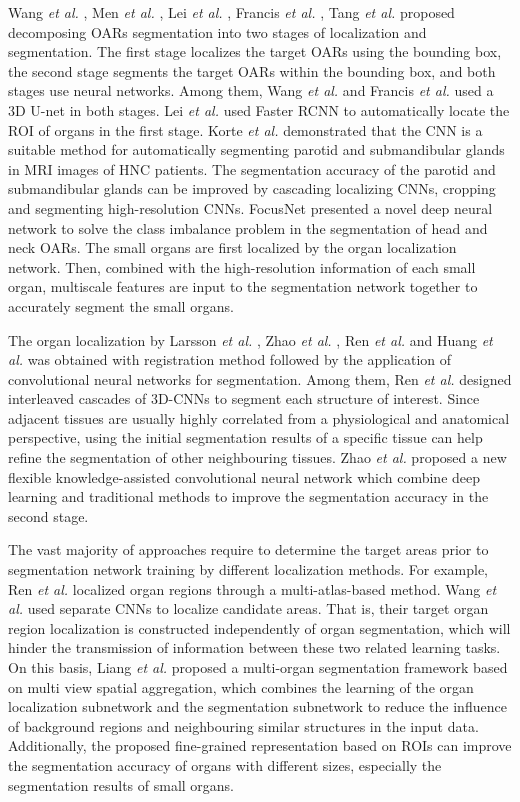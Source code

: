 \documentclass[lettersize,journal]{IEEEtran}
\begin{document}
Wang {\it{et al.}} \cite{137}, Men {\it{et al.}} \cite{138}, Lei {\it{et al.}} \cite{144}, Francis {\it{et al.}} \cite{151}, Tang {\it{et al.}} \cite{139} proposed decomposing OARs segmentation into two stages of localization and segmentation. The first stage localizes the target OARs using the bounding box, the second stage segments the target OARs within the bounding box, and both stages use neural networks. Among them, Wang {\it{et al.}} \cite{137} and Francis {\it{et al.}} \cite{151} used a 3D U-net in both stages. Lei {\it{et al.}} \cite{144} used Faster RCNN to automatically locate the ROI of organs in the first stage. Korte {\it{et al.}} \cite{146} demonstrated that the CNN is a suitable method for automatically segmenting parotid and submandibular glands in MRI images of HNC patients. The segmentation accuracy of the parotid and submandibular glands can be improved by cascading localizing CNNs, cropping and segmenting high-resolution CNNs. FocusNet \cite{108,142} presented a novel deep neural network to solve the class imbalance problem in the segmentation of head and neck OARs. The small organs are first localized by the organ localization network. Then, combined with the high-resolution information of each small organ, multiscale features are input to the segmentation network together to accurately segment the small organs.

The organ localization by Larsson {\it{et al.}} \cite{148}, Zhao {\it{et al.}} \cite{149}, Ren {\it{et al.}} \cite{122} and Huang {\it{et al.}} \cite{145} was obtained with registration method followed by the application of convolutional neural networks for segmentation. Among them, Ren {\it{et al.}} \cite{122} designed interleaved cascades of 3D-CNNs to segment each structure of interest. Since adjacent tissues are usually highly correlated from a physiological and anatomical perspective, using the initial segmentation results of a specific tissue can help refine the segmentation of other neighbouring tissues. Zhao {\it{et al.}} \cite{149} proposed a new flexible knowledge-assisted convolutional neural network which combine deep learning and traditional methods to improve the segmentation accuracy in the second stage.

The vast majority of approaches require to determine the target areas prior to segmentation network training by different localization methods. For example, Ren {\it{et al.}} \cite{122} localized organ regions through a multi-atlas-based method. Wang {\it{et al.}} \cite{137} used separate CNNs to localize candidate areas. That is, their target organ region localization is constructed independently of organ segmentation, which will hinder the transmission of information between these two related learning tasks. On this basis, Liang {\it{et al.}} \cite{141} proposed a multi-organ segmentation framework based on multi view spatial aggregation, which combines the learning of the organ localization subnetwork and the segmentation subnetwork to reduce the influence of background regions and neighbouring similar structures in the input data. Additionally, the proposed fine-grained representation based on ROIs can improve the segmentation accuracy of organs with different sizes, especially the segmentation results of small organs.
\end{document}
